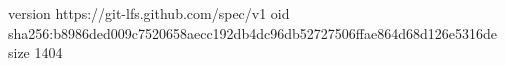 version https://git-lfs.github.com/spec/v1
oid sha256:b8986ded009c7520658aecc192db4dc96db52727506ffae864d68d126e5316de
size 1404
